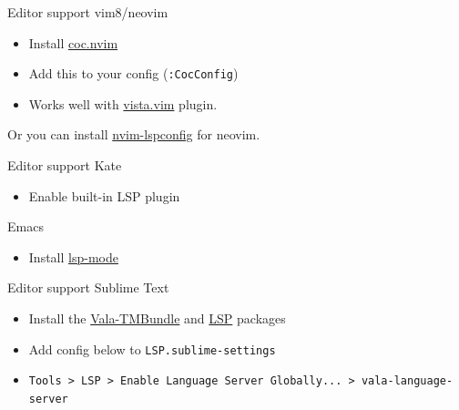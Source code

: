 \documentclass[t]{beamer}
\begin{document}

\begin{frame}[c]{Editor support}
    vim8/neovim
    \begin{itemize}
        \item Install \href{https://github.com/neoclide/coc.nvim}{coc.nvim}
        \item Add this to your config (\texttt{:CocConfig})
        \item Works well with \href{https://github.com/liuchengxu/vista.vim}{vista.vim} plugin.
    \end{itemize}
    \exampleCode
    
    Or you can install \href{https://github.com/neovim/nvim-lspconfig/blob/f81570d1288fd974098e0f311f728469ca919155/lua/lspconfig/vala\_ls.lua}{nvim-lspconfig} for neovim.
\end{frame}

\begin{frame}[c]{Editor support}
    Kate
    \begin{itemize}
        \item Enable built-in LSP plugin
    \end{itemize}
    
    Emacs
    \begin{itemize}
        \item Install \href{https://emacs-lsp.github.io/lsp-mode/page/lsp-vala/}{lsp-mode}
    \end{itemize}
\end{frame}


\begin{frame}[c]{Editor support}
    Sublime Text
    \begin{itemize}
        \item Install the \href{https://packagecontrol.io/packages/Vala-TMBundle}{Vala-TMBundle} and \href{https://github.com/sublimelsp/LSP}{LSP} packages
        \item Add config below to \texttt{LSP.sublime-settings}
        \item \texttt{Tools > LSP > Enable Language Server Globally... > vala-language-server}
    \end{itemize}
    \exampleCode
\end{frame}
\end{document}
